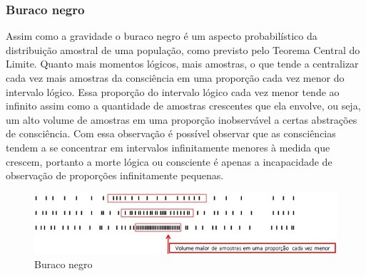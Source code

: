 \subsubsection{Buraco negro}
Assim como a gravidade o buraco negro é um aspecto probabilístico da distribuição amostral de uma população, como previsto pelo Teorema Central do Limite. Quanto mais momentos lógicos, mais amostras, o que tende a centralizar cada vez mais amostras da consciência em uma proporção cada vez menor do intervalo lógico. Essa proporção do intervalo lógico cada vez menor tende ao infinito assim como a quantidade de amostras crescentes que ela envolve, ou seja, um alto volume de amostras em uma proporção inobservável a certas abstrações de consciência. Com essa observação é possível observar que as consciências tendem a se concentrar em intervalos infinitamente menores à medida que crescem, portanto a morte lógica ou consciente é apenas a incapacidade de observação de proporções infinitamente pequenas.

\begin{figure}[H]
\caption{Buraco negro}
\label{fig:consciousness_black_hole}
\centering
\includegraphics[scale=1]{sections/images/consciousness_black_hole.jpg}
\end{figure}

